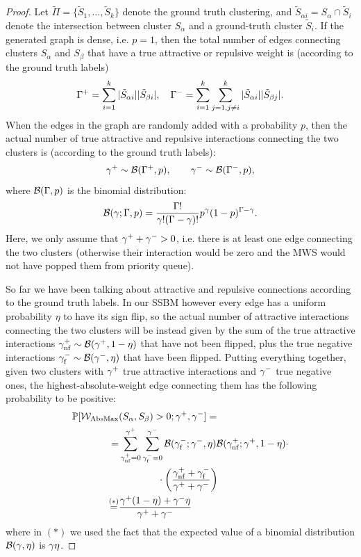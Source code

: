 \begin{proof}
Let $\tilde{\Pi}=\{\tilde{S}_1,\ldots,\tilde{S}_k\}$ denote the ground truth clustering, and $\tilde{S}_{\alpha i}=S_\alpha\cap \tilde{S}_i$ denote the intersection between cluster $S_{\alpha}$ and a ground-truth cluster $\tilde{S}_i$.
If the generated graph is dense, i.e. $p=1$, then the total number of edges connecting clusters $S_{\alpha}$ and $S_{\beta}$ that have a true attractive or repulsive weight is (according to the ground truth labels)
\begin{equation}
\Gamma^+=\sum_{i=1}^k |\tilde{S}_{\alpha i}||\tilde{S}_{\beta i}|, \quad \Gamma^-=\sum_{i=1}^k \sum_{j=1,j\neq i}^k |\tilde{S}_{\alpha i}||\tilde{S}_{\beta j}|.
\end{equation}
When the edges in the graph are randomly added with a probability $p$, then the actual number of true attractive and repulsive interactions connecting the two clusters is (according to the ground truth labels):
\begin{equation}
\gamma^+ \sim \mathcal{B}(\Gamma^+,p), \qquad \gamma^- \sim \mathcal{B}(\Gamma^-,p), 
\end{equation}
where $\mathcal{B}(\Gamma,p)$ is the binomial distribution:
\begin{equation}
\mathcal{B}(\gamma;\Gamma,p) = \frac{\Gamma !}{\gamma! (\Gamma-\gamma)!} p^\gamma (1-p)^{\Gamma-\gamma}.
\end{equation}
Here, we only assume that $\gamma^+ + \gamma^- >0$, i.e. there is at least one edge connecting the two clusters (otherwise their interaction would be zero and the MWS would not have popped them from priority queue). 

So far we have been talking about attractive and repulsive connections according to the ground truth labels. In our SSBM however every edge has a uniform probability $\eta$ to have its sign flip, so  the actual number of attractive interactions connecting the two clusters will be instead given by the sum of the true attractive interactions $\gamma^+_{\mathrm{nf}}\sim \mathcal{B}(\gamma^+,1-\eta)$ that have not been flipped, plus the true negative interactions $\gamma^-_{\mathrm{f}}\sim \mathcal{B}(\gamma^-,\eta)$ that have been flipped.
Putting everything together, given two clusters with $\gamma^+$ true attractive interactions and $\gamma^-$ true negative ones, the highest-absolute-weight edge connecting them has the following probability to be positive:
\begin{align}\label{eq:mws_prob}
 \mathbb{P}[\mathcal{W}_{\mathrm{AbsMax}}&(S_\alpha,S_\beta)>0;\gamma^+,\gamma^-] = \nonumber \\
=&\sum_{\gamma^+_{\mathrm{nf}}=0}^{\gamma^+}\sum_{\gamma^-_{\mathrm{f}}=0}^{\gamma^-} 
\mathcal{B}(\gamma^-_{\mathrm{f}};\gamma^-,\eta) \mathcal{B}(\gamma^+_{\mathrm{nf}};\gamma^+,1-\eta)\cdot  \nonumber\\
& \qquad \qquad  \cdot \left(\frac{\gamma^+_{\mathrm{nf}}+\gamma^-_{\mathrm{f}}}{\gamma^+ + \gamma^-} \right) \nonumber\\
\stackrel{(*)}{=}&\frac{\gamma^+(1-\eta)+\gamma^-\eta}{\gamma^+ + \gamma^-}
\end{align}  
where in $(*)$ we used the fact that the expected value of a binomial distribution $\mathcal{B}(\gamma,\eta)$ is $\gamma \eta$.


\end{proof}
